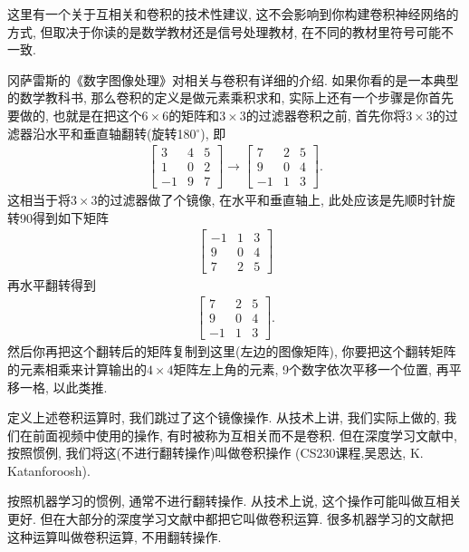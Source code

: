 这里有一个关于互相关和卷积的技术性建议, 这不会影响到你构建卷积神经网络的方式, 但取决于你读的是数学教材还是信号处理教材, 在不同的教材里符号可能不一致.
\begin{remark}
冈萨雷斯的《数字图像处理》对相关与卷积有详细的介绍.
如果你看的是一本典型的数学教科书, 那么卷积的定义是做元素乘积求和, 实际上还有一个步骤是你首先要做的, 也就是在把这个$6\times 6$的矩阵和$3\times 3$的过滤器卷积之前,
首先你将$3\times 3$的过滤器沿水平和垂直轴翻转(旋转180$^\circ$), 即
\begin{align*}
\left[\begin{array}{ccc}
3 & 4 & 5 \\
1 & 0 & 2 \\
-1 & 9 & 7
\end{array}\right]\rightarrow\left[\begin{array}{crr}
7 & 2 & 5 \\
9 & 0 & 4 \\
-1 & 1 & 3
\end{array}\right].
\end{align*}
这相当于将$3\times 3$的过滤器做了个镜像, 在水平和垂直轴上, 此处应该是先顺时针旋转90得到如下矩阵
\begin{align*}
\left[\begin{array}{ccc}
-1 & 1 & 3 \\
9 & 0 & 4 \\
7 & 2 & 5
\end{array}\right]
\end{align*}
再水平翻转得到
\begin{align*}
\left[\begin{array}{ccc}
7 & 2 & 5 \\
9 & 0 & 4 \\
-1 & 1 & 3
\end{array}\right].
\end{align*}
然后你再把这个翻转后的矩阵复制到这里(左边的图像矩阵), 你要把这个翻转矩阵的元素相乘来计算输出的$4\times 4$矩阵左上角的元素,
9个数字依次平移一个位置, 再平移一格, 以此类推.
\end{remark}
\begin{remark}
    定义上述卷积运算时, 我们跳过了这个镜像操作. 从技术上讲, 我们实际上做的, 我们在前面视频中使用的操作, 有时被称为互相关而不是卷积.
    但在深度学习文献中, 按照惯例, 我们将这(不进行翻转操作)叫做卷积操作 (CS230课程,吴恩达, K. Katanforoosh).
\end{remark}

按照机器学习的惯例, 通常不进行翻转操作. 从技术上说, 这个操作可能叫做互相关更好.
但在大部分的深度学习文献中都把它叫做卷积运算.
很多机器学习的文献把这种运算叫做卷积运算, 不用翻转操作.

